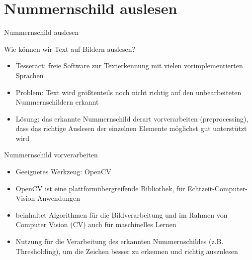 \section{Nummernschild auslesen}

\begin{frame}{Nummernschild auslesen}

Wie können wir Text auf Bildern auslesen?

\begin{itemize}
\item Tesseract: freie Software zur Texterkennung mit vielen vorimplementierten Sprachen
\item Problem: Text wird größtenteils noch nicht richtig auf den unbearbeiteten Nummernschildern erkannt
\item Lösung: das erkannte Nummernschild derart vorverarbeiten (preprocessing), dass das richtige Auslesen der einzelnen Elemente möglichst gut unterstützt wird
\end{itemize}

\end{frame}

\begin{frame}{Nummernschild vorverarbeiten}

\begin{itemize}
\item Geeignetes Werkzeug: OpenCV
\item OpenCV ist eine plattformübergreifende Bibliothek, für Echtzeit-Computer-Vision-Anwendungen
\item beinhaltet Algorithmen für die Bildverarbeitung und im Rahmen von Computer Vision (CV) auch für maschinelles Lernen
\item Nutzung für die Verarbeitung des erkannten Nummernschildes (z.B. Thresholding), um die Zeichen besser zu erkennen und richtig auszulesen
\end{itemize}

\end{frame}

